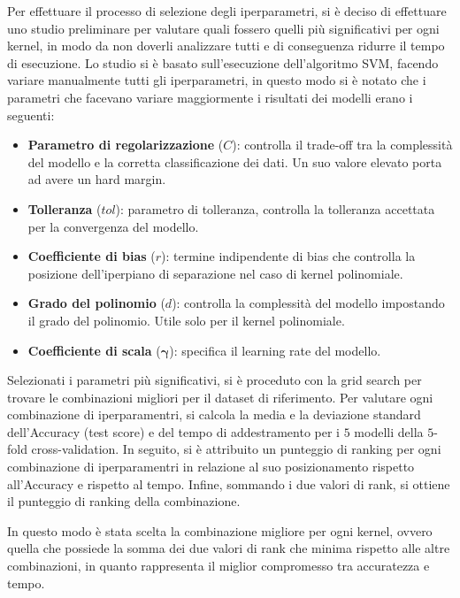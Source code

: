 Per effettuare il processo di selezione degli iperparametri, si è deciso di
effettuare uno studio preliminare per valutare quali fossero quelli più
significativi per ogni kernel, in modo da non doverli analizzare tutti e di
conseguenza ridurre il tempo di esecuzione. Lo studio si è basato sull'esecuzione
dell'algoritmo SVM, facendo variare manualmente tutti gli iperparametri, in questo
modo si è notato che i parametri che facevano variare maggiormente i risultati
dei modelli erano i seguenti:
\begin{itemize}
    \item \textbf{Parametro di regolarizzazione} ($C$): controlla il trade-off tra
          la complessità del modello e la corretta classificazione dei dati.
          Un suo valore elevato porta ad avere un hard margin.
    \item \textbf{Tolleranza} ($tol$): parametro di tolleranza, controlla la
          tolleranza accettata per la convergenza del modello.
    \item \textbf{Coefficiente di bias} ($r$): termine indipendente di bias che
          controlla la posizione dell'iperpiano di separazione nel caso di
          kernel polinomiale.
    \item \textbf{Grado del polinomio} ($d$): controlla la complessità del modello
          impostando il grado del polinomio. Utile solo per il kernel polinomiale.
    \item \textbf{Coefficiente di scala} ($\boldsymbol{\gamma}$): specifica il learning
          rate del modello.
\end{itemize}

Selezionati i parametri più significativi, si è proceduto con la grid search
per trovare le combinazioni migliori per il dataset di riferimento. Per valutare
ogni combinazione di iperparamentri, si calcola la media e la deviazione standard
dell'Accuracy (test score) e del tempo di addestramento per i $5$ modelli della $5$-fold
cross-validation.
In seguito, si è attribuito un punteggio di ranking per ogni combinazione
di iperparamentri in relazione al suo posizionamento rispetto all'Accuracy e rispetto
al tempo. Infine, sommando i due valori di rank, si ottiene il punteggio di ranking
della combinazione.

In questo modo è stata scelta la combinazione migliore per ogni kernel, ovvero quella che possiede la somma
dei due valori di rank che minima rispetto alle altre combinazioni, in quanto rappresenta
il miglior compromesso tra accuratezza e tempo.

